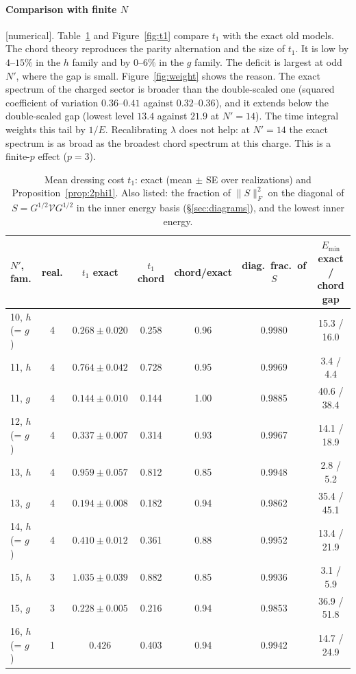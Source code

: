 \documentclass[11pt]{article}
\newcommand{\Np}{N'}
\newcommand{\Vc}{\mathcal V}
\newcommand{\tagbox}[2]{\textsf{\small\color{#1}[#2]}}
\newcommand{\NUM}{\tagbox{cnum}{numerical}}
\theoremstyle{plain}
\theoremstyle{remark}
\numberwithin{equation}{section}
\begin{document}
\paragraph{Comparison with finite $N$} \NUM. Table~\ref{tab:t1} and Figure~\ref{fig:t1} compare $t_1$ with the exact
old models. The chord theory reproduces the parity alternation and the size of $t_1$. It is low by $4$--$15\%$ in the
$h$ family and by $0$--$6\%$ in the $g$ family. The deficit is largest at odd $\Np$, where the gap is small.
Figure~\ref{fig:weight} shows the reason. The exact spectrum of the charged sector is broader than the double-scaled one
(squared coefficient of variation $0.36$--$0.41$ against $0.32$--$0.36$), and it extends below the double-scaled gap
(lowest level $13.4$ against $21.9$ at $\Np=14$). The time integral weights this tail by $1/E$. Recalibrating $\lambda$
does not help: at $\Np=14$ the exact spectrum is as broad as the broadest chord spectrum at this charge. This is a
finite-$p$ effect ($p=3$).

\begin{table}[ht]
\centering\small
\caption{Mean dressing cost $t_1$: exact (mean $\pm$ SE over realizations) and Proposition~\ref{prop:2phi1}. Also
listed: the fraction of $\|S\|_F^2$ on the diagonal of $S=G^{1/2}\Vc G^{1/2}$ in the inner energy basis
(\S\ref{sec:diagrams}), and the lowest inner energy.}
\label{tab:t1}
\setlength{\tabcolsep}{5pt}
\begin{tabular}{lcccccc}\toprule
$\Np$, fam. & real. & $t_1$ exact & $t_1$ chord & chord/exact & diag.\ frac.\ of $S$ & $E_{\min}$ exact / chord gap\\\midrule
10, $h$ (= $g$) & 4 & $0.268\pm0.020$ & 0.258 & 0.96 & 0.9980 & 15.3 / 16.0\\
11, $h$ & 4 & $0.764\pm0.042$ & 0.728 & 0.95 & 0.9969 & 3.4 / 4.4\\
11, $g$ & 4 & $0.144\pm0.010$ & 0.144 & 1.00 & 0.9885 & 40.6 / 38.4\\
12, $h$ (= $g$) & 4 & $0.337\pm0.007$ & 0.314 & 0.93 & 0.9967 & 14.1 / 18.9\\
13, $h$ & 4 & $0.959\pm0.057$ & 0.812 & 0.85 & 0.9948 & 2.8 / 5.2\\
13, $g$ & 4 & $0.194\pm0.008$ & 0.182 & 0.94 & 0.9862 & 35.4 / 45.1\\
14, $h$ (= $g$) & 4 & $0.410\pm0.012$ & 0.361 & 0.88 & 0.9952 & 13.4 / 21.9\\
15, $h$ & 3 & $1.035\pm0.039$ & 0.882 & 0.85 & 0.9936 & 3.1 / 5.9\\
15, $g$ & 3 & $0.228\pm0.005$ & 0.216 & 0.94 & 0.9853 & 36.9 / 51.8\\
16, $h$ (= $g$) & 1 & $0.426$ & 0.403 & 0.94 & 0.9942 & 14.7 / 24.9\\
\bottomrule\end{tabular}
\end{table}
\end{document}
